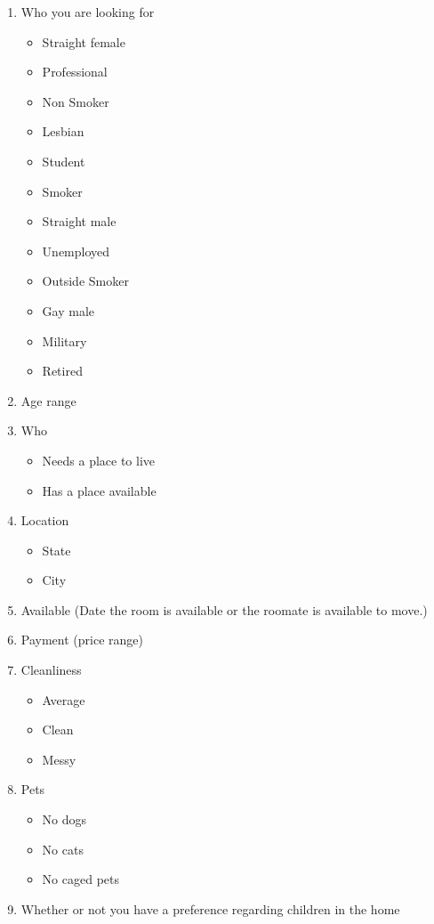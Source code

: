 \documentclass[11pt, draft, journal]{./IEEE/IEEEtran}
\begin{document}
\begin{enumerate}
    \item Who you are looking for
    \begin{itemize}
        \item Straight female
        \item Professional
        \item Non Smoker
        \item Lesbian
        \item Student
        \item Smoker
        \item Straight male
        \item Unemployed
        \item Outside Smoker
        \item Gay male
        \item Military
        \item Retired
    \end{itemize}
    \item Age range
    \item Who
    \begin{itemize}
        \item Needs a place to live
        \item Has a place available
    \end{itemize}
    \item Location
    \begin{itemize}
        \item State
        \item City
    \end{itemize}
    \item Available (Date the room is available or the roomate is available to move.)
    \item Payment (price range)
    \item Cleanliness
    \begin{itemize}
        \item Average
        \item Clean
        \item Messy
    \end{itemize}
    \item Pets
    \begin{itemize}
        \item No dogs
        \item No cats
        \item No caged pets
    \end{itemize}
    \item Whether or not you have a preference regarding children in the home
\end{enumerate}
\end{document}
